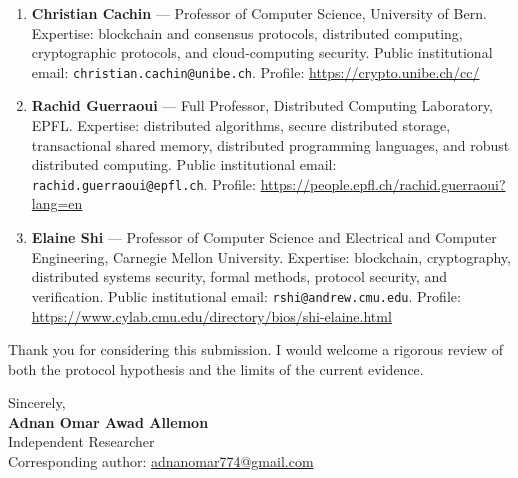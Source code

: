 \documentclass[10pt]{article}
\begin{document}
\begin{enumerate}
\item \textbf{Christian Cachin} --- Professor of Computer Science, University of Bern. Expertise: blockchain and consensus protocols, distributed computing, cryptographic protocols, and cloud-computing security. Public institutional email: \texttt{christian.cachin@unibe.ch}. Profile: \url{https://crypto.unibe.ch/cc/}
\item \textbf{Rachid Guerraoui} --- Full Professor, Distributed Computing Laboratory, EPFL. Expertise: distributed algorithms, secure distributed storage, transactional shared memory, distributed programming languages, and robust distributed computing. Public institutional email: \texttt{rachid.guerraoui@epfl.ch}. Profile: \url{https://people.epfl.ch/rachid.guerraoui?lang=en}
\item \textbf{Elaine Shi} --- Professor of Computer Science and Electrical and Computer Engineering, Carnegie Mellon University. Expertise: blockchain, cryptography, distributed systems security, formal methods, protocol security, and verification. Public institutional email: \texttt{rshi@andrew.cmu.edu}. Profile: \url{https://www.cylab.cmu.edu/directory/bios/shi-elaine.html}
\end{enumerate}

Thank you for considering this submission. I would welcome a rigorous review of both the protocol hypothesis and the limits of the current evidence.

Sincerely,\\[0.15em]
\textbf{Adnan Omar Awad Allemon}\\
Independent Researcher\\
Corresponding author: \href{mailto:adnanomar774@gmail.com}{adnanomar774@gmail.com}
\end{document}
